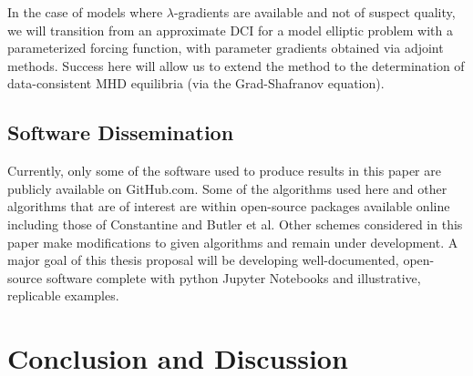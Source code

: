 \documentclass{amsart}
\begin{document}
In the case of models where $\lambda$-gradients are available and not of suspect quality, we will
transition from an approximate DCI for a model elliptic problem with a parameterized forcing function, with parameter gradients obtained via adjoint methods.  Success here will allow us to extend the
method to the determination of data-consistent MHD equilibria (via the Grad-Shafranov equation).  





\subsection{Software Dissemination}

Currently, only some of the software used to produce results in this paper are publicly available on GitHub.com. Some of the algorithms used here and other algorithms that are of interest are within open-source packages available online including those of Constantine and Butler et al. Other schemes considered in this paper make modifications to given algorithms and remain under development. A major goal of this thesis proposal will be developing well-documented, open-source software complete with python Jupyter Notebooks and illustrative, replicable examples.


\section{Conclusion and Discussion}
\end{document}
